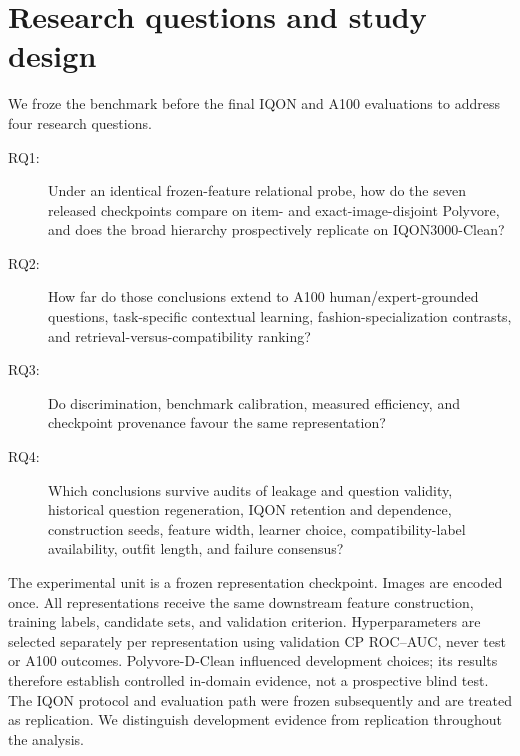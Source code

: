 \documentclass[preprint,12pt]{elsarticle}
\begin{document}
\section{Research questions and study design}\label{sec:design}

We froze the benchmark before the final IQON and A100 evaluations to address four research questions.

\begin{description}
\item[RQ1:] Under an identical frozen-feature relational probe, how do the seven released checkpoints compare on item- and exact-image-disjoint Polyvore, and does the broad hierarchy prospectively replicate on IQON3000-Clean?
\item[RQ2:] How far do those conclusions extend to A100 human/expert-grounded questions, task-specific contextual learning, fashion-specialization contrasts, and retrieval-versus-compatibility ranking?
\item[RQ3:] Do discrimination, benchmark calibration, measured efficiency, and checkpoint provenance favour the same representation?
\item[RQ4:] Which conclusions survive audits of leakage and question validity, historical question regeneration, IQON retention and dependence, construction seeds, feature width, learner choice, compatibility-label availability, outfit length, and failure consensus?
\end{description}

The experimental unit is a frozen representation checkpoint. Images are encoded once. All representations receive the same downstream feature construction, training labels, candidate sets, and validation criterion. Hyperparameters are selected separately per representation using validation CP ROC--AUC, never test or A100 outcomes. Polyvore-D-Clean influenced development choices; its results therefore establish controlled in-domain evidence, not a prospective blind test. The IQON protocol and evaluation path were frozen subsequently and are treated as replication. We distinguish development evidence from replication throughout the analysis.
\end{document}
